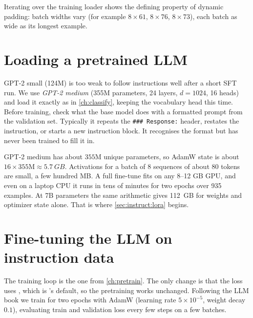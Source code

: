 Iterating over the training loader shows the defining property of dynamic padding:
batch widths vary (for example $8\times61$, $8\times76$, $8\times73$), each batch as
wide as its longest example.

\section{Loading a pretrained LLM}\label{sec:instruct:load}

GPT-2 small (124M) is too weak to follow instructions well after a short SFT run. We
use \emph{GPT-2 medium} (355M parameters, 24 layers, $d=1024$, 16 heads) and load it
exactly as in \cref{ch:classify}, keeping the vocabulary head this time. Before
training, check what the base model does with a formatted prompt from the validation
set. Typically it repeats the \texttt{\#\#\# Response:} header, restates the
instruction, or starts a new instruction block. It recognises the format but has never
been trained to fill it in.

\begin{napkinmath}
GPT-2 medium has about $355$M unique parameters, so AdamW state is about
$16\times355\text{M}\approx\SI{5.7}{GB}$. Activations for a batch of 8 sequences of
about 80 tokens are small, a few hundred MB. A full fine-tune fits on any 8--12 GB GPU,
and even on a laptop CPU it runs in tens of minutes for two epochs over 935 examples.
At 7B parameters the same arithmetic gives \SI{112}{GB} for weights and optimizer state
alone. That is where \cref{sec:instruct:lora} begins.
\end{napkinmath}

\section{Fine-tuning the LLM on instruction data}\label{sec:instruct:train}

The training loop is the one from \cref{ch:pretrain}. The only change is that the loss
uses , which is 's default, so the
pretraining  works unchanged. Following the LLM book we train for two
epochs with AdamW (learning rate $5\times10^{-5}$, weight decay $0.1$), evaluating
train and validation loss every few steps on a few batches.

